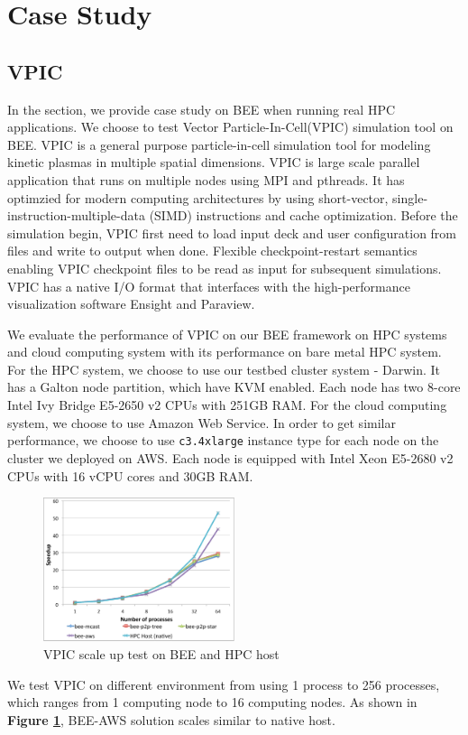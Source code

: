 \section{Case Study}
  \label{sec:case_study}
  \subsection{VPIC}
  In the section, we provide case study on BEE when running real HPC applications. We choose to test Vector Particle-In-Cell(VPIC) simulation tool \cite{bowers20080, bowers2008ultrahigh, bowers2009advances} on BEE. VPIC is a general purpose particle-in-cell simulation tool for modeling kinetic plasmas in multiple spatial dimensions. VPIC is large scale parallel application that runs on multiple nodes using MPI and pthreads. It has optimzied for modern computing architectures by using short-vector, single-instruction-multiple-data (SIMD) instructions and cache optimization. Before the simulation begin, VPIC first need to load input deck and user configuration from files and write to output when done. Flexible checkpoint-restart semantics enabling VPIC checkpoint files to be read as input for subsequent simulations. VPIC has a native I/O format that interfaces with the high-performance visualization software Ensight and Paraview. 

We evaluate the performance of VPIC on our BEE framework on HPC systems and cloud computing system with  its performance on bare metal HPC system. For the HPC system, we choose to use our testbed cluster system - Darwin. It has a Galton node partition, which have KVM enabled. Each node has two 8-core Intel Ivy Bridge E5-2650 v2 CPUs with 251GB RAM. For the cloud computing system, we choose to use Amazon Web Service. In order to get similar performance, we choose to use \texttt{c3.4xlarge} instance type for each node on the cluster we deployed on AWS. Each node is equipped with Intel Xeon E5-2680 v2 CPUs with 16 vCPU cores and 30GB RAM. 


\begin{figure}[h]
    \centering
    \caption{VPIC scale up test on BEE and HPC host}
    \label{vpic-test}
    \includegraphics[width=0.5\textwidth]{figures/vpic-test.pdf}
\end{figure}

We test VPIC on different environment from using 1 process to 256 processes, which ranges from 1 computing node to 16 computing nodes. As shown in \textbf{Figure \ref{vpic-test}}, BEE-AWS solution scales similar to native host.  
